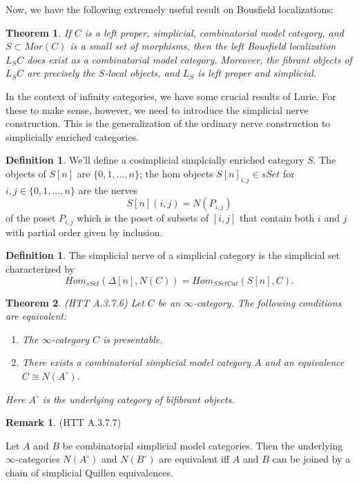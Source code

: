 \documentclass[letterpaper]{article}
\newtheorem{theorem}{Theorem}
\theoremstyle{definition}
\newtheorem{definition}[lemma]{Definition}
\newtheorem{remark}[lemma]{Remark}
\begin{document}
Now, we have the following extremely useful result on Bousfield
localizations:


\begin{theorem}
If $C$ is a left proper, simplicial, combinatorial model category, and
$S \subset Mor(C)$ is a small set of morphisms, then the left
Bousfield localization $L_SC$ does exist as a combinatorial model
category. Moreover, the fibrant objects of $L_SC$ are precisely the
$S$-local objects, and $L_S$ is left proper and simplicial.
\end{theorem}

In the context of infinity categories, we have some crucial
results of Lurie. For these to make sense, however, we need to
introduce the simplicial nerve construction. This is the
generalization of the ordinary nerve construction to simplicially
enriched categories.

\begin{definition}
We'll define a cosimplicial simplcially enriched category $S$. The
objects of $S[n]$ are $\{0,1,\dots,n\}$; the hom objects $S[n]_{i,j}
\in sSet$ for $i,j \in \{0,1,\dots,n\}$ are the nerves
\[
S[n](i,j) = N(P_{i,j})
\]
of the poset $P_{i,j}$ which is the poset of subsets of $[i,j]$ that
contain both $i$ and $j$ with partial order given by inclusion.
\end{definition}

\begin{definition}
The simplicial nerve of a simplicial category is the simplicial set
characterized by
\[
Hom_{sSet}(\Delta[n],N(C)) = Hom_{SSetCat}(S[n],C).
\]
\end{definition}

\begin{theorem}(HTT A.3.7.6)
Let $C$ be an $\infty$-category. The following conditions are
equivalent:

\begin{enumerate}
\item The $\infty$-category $C$ is presentable.
\item There exists a combinatorial simplicial model category $A$ and
  an equivalence $C \cong N(A^\circ)$.
\end{enumerate}

Here $A^{\circ}$ is the underlying category of bifibrant objects.
\end{theorem}

\begin{remark}(HTT A.3.7.7)

Let $A$ and $B$ be combinatorial simplicial model categories. Then the
underlying $\infty$-categories $N(A^\circ)$ and $N(B^\circ)$ are
equivalent iff $A$ and $B$ can be joined by a chain of simplicial
Quillen equivalences.
\end{remark}
\end{document}
